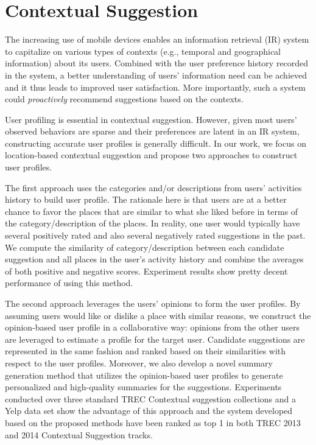 %
%
\chapter{Contextual Suggestion}
The increasing use of mobile devices enables an information retrieval (IR) 
system to capitalize on various types of contexts 
(e.g., temporal and geographical information) about its users. 
Combined with the user preference history recorded in the system, 
a better understanding of users' information need can be achieved and 
it thus leads to improved user satisfaction. More importantly, such a 
system could {\em proactively} recommend suggestions based on the contexts.

User profiling is essential in contextual suggestion. However, given most 
users' observed behaviors are sparse and their preferences are latent in 
an IR system, constructing accurate user profiles is generally difficult. 
In our work, we focus on location-based contextual suggestion and propose 
two approaches to construct user profiles. 

The first approach uses the categories and/or descriptions from 
users' activities history to build user profile. The rationale here is 
that users are at a better chance to favor the places that are similar 
to what she liked before in terms of the category/description of the places. 
In reality, one user would typically have several positively rated and also 
several negatively rated suggestions in the past. We compute the similarity 
of category/description between each candidate suggestion and all 
places in the user's activity history and combine the averages of 
both positive and negative scores. 
Experiment results show pretty decent performance of using this method. 

The second approach leverages the users' opinions to form the user profiles. 
By assuming users would like or dislike a place with similar reasons, 
we construct the opinion-based user profile in a collaborative way: 
opinions from the other users are leveraged to estimate a profile for 
the target user. Candidate suggestions are represented in the same fashion 
and ranked based on their similarities with respect to the user profiles.
Moreover, we also develop a novel summary generation method that utilizes 
the opinion-based user profiles to generate personalized and high-quality 
summaries for the suggestions. 
Experiments conducted over three standard TREC Contextual suggestion 
collections and a Yelp data set show the advantage of this approach and 
the system developed based on the proposed methods have been ranked as 
top 1 in both TREC 2013 and 2014 Contextual Suggestion tracks.

